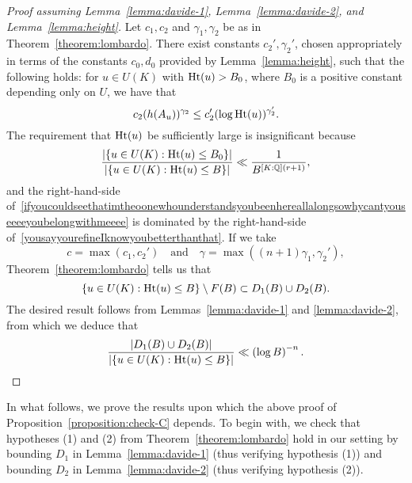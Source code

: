 	\begin{proof}[Proof assuming Lemma~\ref{lemma:davide-1}, Lemma~\ref{lemma:davide-2}, and Lemma~\ref{lemma:height}]

		Let $c_1, c_2$ and $\gamma_1, \gamma_2$ be as in Theorem~\ref{theorem:lombardo}. There exist constants $c_2', \gamma_2'$, chosen appropriately in terms of the constants $c_0, d_0$ provided by Lemma~\ref{lemma:height}, such that the following holds: for $u \in U(K)$ with $\operatorname{Ht}(u) > B_0$, where $B_0$ is a positive constant depending only on $U$, we have that
		\[
			c_2(h(A_u))^{\gamma_2} \le c_2'(\log \operatorname{Ht}(u))^{\gamma_2'}.
		\]
		The requirement that $\operatorname{Ht}(u)$ be sufficiently large is insignificant because
		\begin{equation}\label{ifyoucouldseethatimtheoonewhounderstandsyoubeenhereallalongsowhycantyouseeeeyoubelongwithmeeee}
			\frac{|\{ u \in U(K): \operatorname{Ht}(u) \le B_0\}|}{|\{ u \in U(K): \operatorname{Ht}(u) \le B\}|} \ll \frac{1}{B^{[K : {\mathbb Q}](r+1)}},
		\end{equation}
		and the right-hand-side of~\eqref{ifyoucouldseethatimtheoonewhounderstandsyoubeenhereallalongsowhycantyouseeeeyoubelongwithmeeee} is dominated by the right-hand-side of~\eqref{yousayyourefineIknowyoubetterthanthat}.
If we take
		\[
			c = \max(c_1, c_2') \quad \text{and} \quad \gamma = \max((n+1)\gamma_1, \gamma_2'),
		\]
		Theorem~\ref{theorem:lombardo} tells us that
		\[
			\{u \in U(K) : \operatorname{Ht}(u) \le B\} \setminus F(B) \subset D_1(B) \cup D_2(B).
		\]
		The desired result follows from Lemmas~\ref{lemma:davide-1} and \ref{lemma:davide-2}, from which we deduce that
		\[
			\frac{|D_1(B) \cup D_2(B)|}{|\{u \in U(K) : \operatorname{Ht}(u) \le B\}|} \ll \left( \log B \right)^{-n}. \qedhere
		\]
	\end{proof}

In what follows, we prove the results upon which the above proof of Proposition~\ref{proposition:check-C} depends. To begin with, we check that hypotheses (1) and (2) from Theorem~\ref{theorem:lombardo} hold in our setting by bounding $D_1$ in Lemma~\ref{lemma:davide-1} (thus verifying hypothesis (1)) and bounding $D_2$ in Lemma~\ref{lemma:davide-2} (thus verifying hypothesis (2)).

